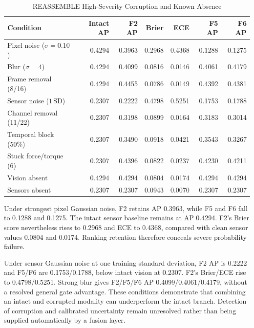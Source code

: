 \begin{table}[htbp]
\caption{REASSEMBLE High-Severity Corruption and Known Absence}
\label{tab:reassemble-corruption}
\centering\small\setlength{\tabcolsep}{3pt}
\begin{tabular}{lrrrrrr}\toprule
Condition & Intact AP & F2 AP & Brier & ECE & F5 AP & F6 AP\\\midrule
Pixel noise ($\sigma=0.10$) & 0.4294 & 0.3963 & 0.2968 & 0.4368 & 0.1288 & 0.1275\\
Blur ($\sigma=4$) & 0.4294 & 0.4099 & 0.0816 & 0.0146 & 0.4061 & 0.4179\\
Frame removal (8/16) & 0.4294 & 0.4455 & 0.0786 & 0.0149 & 0.4392 & 0.4381\\
Sensor noise ($1\,\mathrm{SD}$) & 0.2307 & 0.2222 & 0.4798 & 0.5251 & 0.1753 & 0.1788\\
Channel removal (11/22) & 0.2307 & 0.3198 & 0.0899 & 0.0164 & 0.3183 & 0.3014\\
Temporal block (50\%) & 0.2307 & 0.3490 & 0.0918 & 0.0421 & 0.3543 & 0.3267\\
Stuck force/torque (6) & 0.2307 & 0.4396 & 0.0822 & 0.0237 & 0.4230 & 0.4211\\
Vision absent & 0.4294 & 0.4294 & 0.0804 & 0.0174 & 0.4294 & 0.4294\\
Sensors absent & 0.2307 & 0.2307 & 0.0943 & 0.0070 & 0.2307 & 0.2307\\
\bottomrule\end{tabular}
\end{table}

Under strongest pixel Gaussian noise, F2 retains AP 0.3963, while F5 and F6 fall to
0.1288 and 0.1275. The intact sensor baseline remains at AP 0.4294. F2's Brier score
nevertheless rises to 0.2968 and ECE to 0.4368, compared with clean sensor values 0.0804
and 0.0174. Ranking retention therefore conceals severe probability failure.

Under sensor Gaussian noise at one training standard deviation, F2 AP is 0.2222 and
F5/F6 are 0.1753/0.1788, below intact vision at 0.2307. F2's Brier/ECE rise to
0.4798/0.5251. Strong blur gives F2/F5/F6 AP 0.4099/0.4061/0.4179, without a resolved
general gate advantage. These conditions demonstrate that combining an intact and
corrupted modality can underperform the intact branch. Detection of corruption and
calibrated uncertainty remain unresolved rather than being supplied automatically by a
fusion layer.

